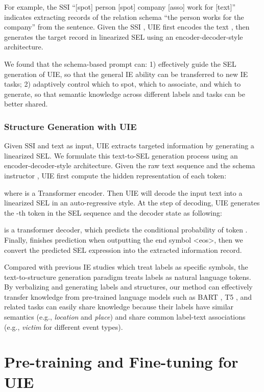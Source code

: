 \documentclass[11pt]{article}
\begin{document}
For example, the SSI ``[spot] person [spot] company [asso] work for [text]'' indicates extracting records of the relation schema ``the person works for the company'' from the sentence.
Given the SSI , UIE first encodes the text , then generates the target record  in linearized SEL using an encoder-decoder-style architecture.

We found that the schema-based prompt can:
1) effectively guide the SEL generation of UIE, so that the general IE ability can be transferred to new IE tasks;
2) adaptively control which to spot, which to associate, and which to generate, so that semantic knowledge across different labels and tasks can be better shared.

\subsubsection{Structure Generation with UIE}
Given SSI  and text  as input, UIE extracts targeted information by generating a linearized SEL.
We formulate this text-to-SEL generation process using an encoder-decoder-style architecture.
Given the raw text sequence  and the schema instructor , UIE first compute the hidden representation  of each token:

where  is a Transformer encoder.
Then UIE will decode the input text into a linearized SEL in an auto-regressive style.
At the step  of decoding, UIE generates the -th token  in the SEL sequence and the decoder state  as following:

 is a transformer decoder, which predicts the conditional probability  of token .
Finally,  finishes prediction when outputting the end symbol <eos>, then we convert the predicted SEL expression into the extracted information record.

Compared with previous IE studies which treat labels as specific symbols, the text-to-structure generation paradigm treats labels as natural language tokens.
By verbalizing and generating  labels and structures, our method can effectively transfer knowledge from pre-trained language models such as BART \citep{lewis-etal-2020-bart}, T5 \citep{2020t5}, and related tasks can easily share knowledge because their labels have similar semantics (e.g., \textit{location} and \textit{place}) and share common label-text associations (e.g., \textit{victim} for different event types).
 
\section{Pre-training and Fine-tuning for UIE} \label{sec:learning}
\end{document}
